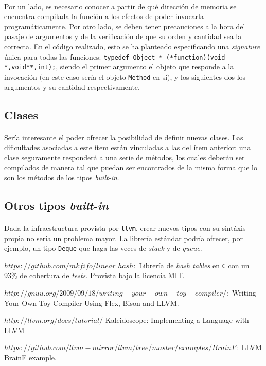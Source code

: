\documentclass[12pt]{article}
\begin{document}
	\paragraph{} Por un lado, es necesario conocer a partir de qué dirección de memoria se encuentra compilada la función a los efectos de poder invocarla programáticamente. Por otro lado, se deben tener precauciones a la hora del pasaje de argumentos y de la verificación de que su orden y cantidad sea la correcta. En el código realizado, esto se ha planteado especificando una \textit{signature} única para todas las funciones: 
	\verb|typedef Object * (*function)(void *,void**,int);|, siendo el primer argumento el objeto que responde a la invocación $($en este caso sería el objeto \verb|Method| en sí$)$, y los siguientes dos los argumentos y su cantidad respectivamente.
	
	\subsection{Clases}
	
	\paragraph{} Sería interesante el poder ofrecer la posibilidad de definir nuevas clases. Las dificultades asociadas a este ítem están vinculadas a las del ítem anterior: una clase seguramente responderá a una serie de métodos, los cuales deberán ser compilados de manera tal que puedan ser encontrados de la misma forma que lo son los métodos de los tipos \textit{built-in}.
	
	\subsection{Otros tipos \textit{built-in}}
	
	\paragraph{} Dada la infraestructura provista por \verb|llvm|, crear nuevos tipos con su sintáxis propia no sería un problema mayor. La librería estándar podría ofrecer, por ejemplo, un tipo \verb|Deque| que haga las veces de \textit{stack} y de \textit{queue}.
	
	\begin{thebibliography}{9}
		
		$https://github.com/mkfifo/linear\_hash : $
		Librería de \textit{hash tables} en \verb|C| con un 93\% de cobertura de \textit{tests}. Provista bajo la licencia MIT.
		
		$http://gnuu.org/2009/09/18/writing-your-own-toy-compiler/ :$
		Writing Your Own Toy Compiler Using Flex, Bison and LLVM.
		
		$http://llvm.org/docs/tutorial/$
		Kaleidoscope: Implementing a Language with LLVM
		
		$https://github.com/llvm-mirror/llvm/tree/master/examples/BrainF :$
		LLVM BrainF example.
		
	\end{thebibliography}
\end{document}
